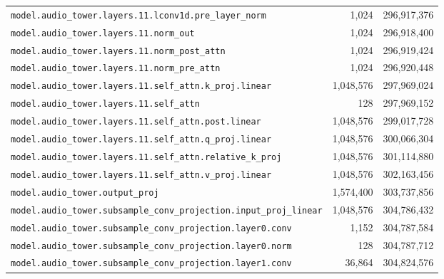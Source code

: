 \documentclass[10pt,a4paper]{article}
\theoremstyle{definition}
\begin{document}
\begin{appendices}
\begin{longtable}{p{9.5cm}rr}
\texttt{model.\allowbreak{}audio\_tower.\allowbreak{}layers.\allowbreak{}11.\allowbreak{}lconv1d.\allowbreak{}pre\_layer\_norm} & 1,024 & 296,917,376 \\
\texttt{model.\allowbreak{}audio\_tower.\allowbreak{}layers.\allowbreak{}11.\allowbreak{}norm\_out} & 1,024 & 296,918,400 \\
\texttt{model.\allowbreak{}audio\_tower.\allowbreak{}layers.\allowbreak{}11.\allowbreak{}norm\_post\_attn} & 1,024 & 296,919,424 \\
\texttt{model.\allowbreak{}audio\_tower.\allowbreak{}layers.\allowbreak{}11.\allowbreak{}norm\_pre\_attn} & 1,024 & 296,920,448 \\
\texttt{model.\allowbreak{}audio\_tower.\allowbreak{}layers.\allowbreak{}11.\allowbreak{}self\_attn.\allowbreak{}k\_proj.\allowbreak{}linear} & 1,048,576 & 297,969,024 \\
\texttt{model.\allowbreak{}audio\_tower.\allowbreak{}layers.\allowbreak{}11.\allowbreak{}self\_attn} & 128 & 297,969,152 \\
\texttt{model.\allowbreak{}audio\_tower.\allowbreak{}layers.\allowbreak{}11.\allowbreak{}self\_attn.\allowbreak{}post.\allowbreak{}linear} & 1,048,576 & 299,017,728 \\
\texttt{model.\allowbreak{}audio\_tower.\allowbreak{}layers.\allowbreak{}11.\allowbreak{}self\_attn.\allowbreak{}q\_proj.\allowbreak{}linear} & 1,048,576 & 300,066,304 \\
\texttt{model.\allowbreak{}audio\_tower.\allowbreak{}layers.\allowbreak{}11.\allowbreak{}self\_attn.\allowbreak{}relative\_k\_proj} & 1,048,576 & 301,114,880 \\
\texttt{model.\allowbreak{}audio\_tower.\allowbreak{}layers.\allowbreak{}11.\allowbreak{}self\_attn.\allowbreak{}v\_proj.\allowbreak{}linear} & 1,048,576 & 302,163,456 \\
\texttt{model.\allowbreak{}audio\_tower.\allowbreak{}output\_proj} & 1,574,400 & 303,737,856 \\
\texttt{model.\allowbreak{}audio\_tower.\allowbreak{}subsample\_conv\_projection.\allowbreak{}input\_proj\_linear} & 1,048,576 & 304,786,432 \\
\texttt{model.\allowbreak{}audio\_tower.\allowbreak{}subsample\_conv\_projection.\allowbreak{}layer0.\allowbreak{}conv} & 1,152 & 304,787,584 \\
\texttt{model.\allowbreak{}audio\_tower.\allowbreak{}subsample\_conv\_projection.\allowbreak{}layer0.\allowbreak{}norm} & 128 & 304,787,712 \\
\texttt{model.\allowbreak{}audio\_tower.\allowbreak{}subsample\_conv\_projection.\allowbreak{}layer1.\allowbreak{}conv} & 36,864 & 304,824,576 \\

\end{longtable}
\end{appendices}
\end{document}
